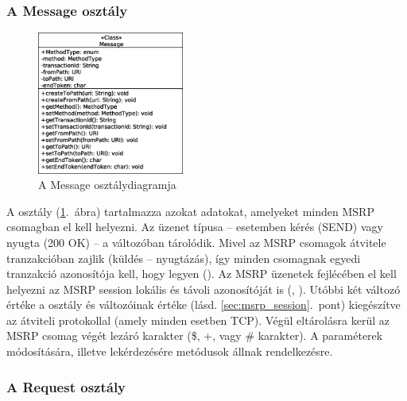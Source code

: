 \subsubsection*{A Message osztály}
\label{sec:msrp_message}

\begin{figure}
  \vspace{-15pt}
  \begin{center}
    \includegraphics[width=0.43\textwidth]{img/class_diagrams/Message.eps}
  \end{center}
  \vspace{-15pt}
  \captionsetup{font=scriptsize}
  \caption{A Message osztálydiagramja}
   \label{fig:class_message}
  \vspace{-10pt}
\end{figure}
A  osztály (\ref{fig:class_message}.~ábra) tartalmazza azokat adatokat, amelyeket minden MSRP csomagban el kell helyezni. Az üzenet típusa -- esetemben kérés (SEND) vagy nyugta (200 OK) -- a  változóban tárolódik. Mivel az MSRP csomagok átvitele tranzakcióban zajlik (küldés -- nyugtázás), így minden csomagnak egyedi tranzakció azonosítója kell, hogy legyen (). Az MSRP üzenetek fejlécében el kell helyezni az MSRP session lokális és távoli azonosítóját is (, ). Utóbbi két változó értéke a  osztály  és  változóinak értéke (lásd. \ref{sec:msrp_session}.~pont) kiegészítve az átviteli protokollal (amely minden esetben TCP). Végül eltárolásra kerül az MSRP csomag végét lezáró karakter (\$, +, vagy  \# karakter). A paraméterek módosítására, illetve lekérdezésére metódusok állnak rendelkezésre.

\subsubsection*{A Request osztály}
\label{sec:msrp_request}

